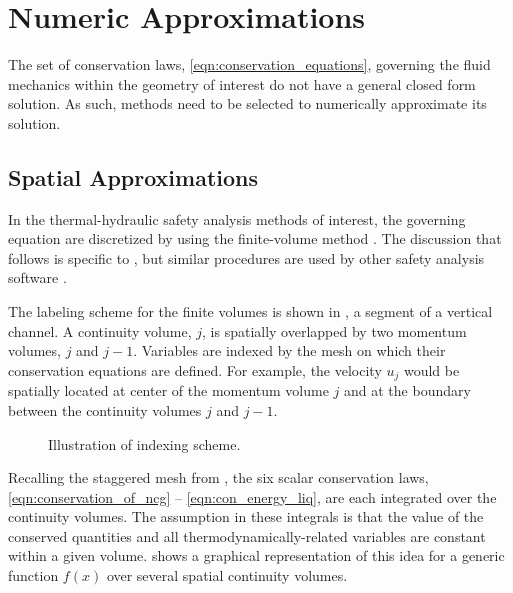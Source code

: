 \section{Numeric Approximations}
\label{sect:numeric_approximation}
The set of conservation laws, \eqref{eqn:conservation_equations}, governing the fluid mechanics within the geometry of interest do not have a general closed form solution.
As such, methods need to be selected to numerically approximate its solution.

\subsection{Spatial Approximations}
\label{subsect:spatial_approx}
In the thermal-hydraulic safety analysis methods of interest, the governing equation are discretized by using the finite-volume method \cite{LeVeque2002}.
The discussion that follows is specific to \cobra{}, but similar procedures are used by other safety analysis software \cite{RELAP,TRACE}.

The labeling scheme for the finite volumes is shown in , a segment of a vertical channel.
A continuity volume, $j$, is spatially overlapped by two momentum volumes, $j$ and $j-1$.
Variables are indexed by the mesh on which their conservation equations are defined.
For example, the velocity $u_j$ would be spatially located at center of the momentum volume $j$ and at the boundary between the continuity volumes $j$ and $j-1$.

\begin{figure}[ht]
\begin{center}
\end{center}
\caption{Illustration of indexing scheme.}
\label{fig:vertical_pipe_with_cells}
\end{figure}

Recalling the staggered mesh from , the six scalar conservation laws, \eqref{eqn:conservation_of_ncg} -- \eqref{eqn:con_energy_liq}, are each integrated over the continuity volumes.
The assumption in these integrals is that the value of the conserved quantities and all thermodynamically-related variables are constant within a given volume.
 shows a graphical representation of this idea for a generic function $f(x)$ over several spatial continuity volumes. 

